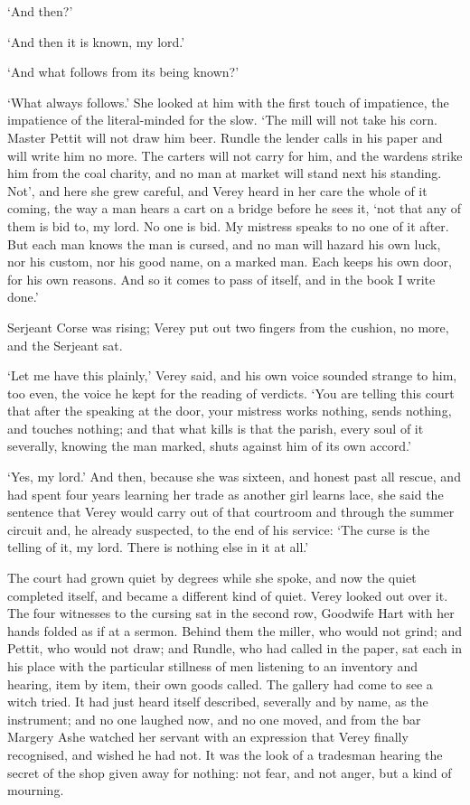 \documentclass[11pt]{article}
\begin{document}
`And then?'

`And then it is known, my lord.'

`And what follows from its being known?'

`What always follows.' She looked at him with the first touch of impatience, the impatience of the literal-minded for the slow. `The mill will not take his corn. Master Pettit will not draw him beer. Rundle the lender calls in his paper and will write him no more. The carters will not carry for him, and the wardens strike him from the coal charity, and no man at market will stand next his standing. Not', and here she grew careful, and Verey heard in her care the whole of it coming, the way a man hears a cart on a bridge before he sees it, `not that any of them is bid to, my lord. No one is bid. My mistress speaks to no one of it after. But each man knows the man is cursed, and no man will hazard his own luck, nor his custom, nor his good name, on a marked man. Each keeps his own door, for his own reasons. And so it comes to pass of itself, and in the book I write done.'

Serjeant Corse was rising; Verey put out two fingers from the cushion, no more, and the Serjeant sat.

`Let me have this plainly,' Verey said, and his own voice sounded strange to him, too even, the voice he kept for the reading of verdicts. `You are telling this court that after the speaking at the door, your mistress works nothing, sends nothing, and touches nothing; and that what kills is that the parish, every soul of it severally, knowing the man marked, shuts against him of its own accord.'

`Yes, my lord.' And then, because she was sixteen, and honest past all rescue, and had spent four years learning her trade as another girl learns lace, she said the sentence that Verey would carry out of that courtroom and through the summer circuit and, he already suspected, to the end of his service: `The curse is the telling of it, my lord. There is nothing else in it at all.'

The court had grown quiet by degrees while she spoke, and now the quiet completed itself, and became a different kind of quiet. Verey looked out over it. The four witnesses to the cursing sat in the second row, Goodwife Hart with her hands folded as if at a sermon. Behind them the miller, who would not grind; and Pettit, who would not draw; and Rundle, who had called in the paper, sat each in his place with the particular stillness of men listening to an inventory and hearing, item by item, their own goods called. The gallery had come to see a witch tried. It had just heard itself described, severally and by name, as the instrument; and no one laughed now, and no one moved, and from the bar Margery Ashe watched her servant with an expression that Verey finally recognised, and wished he had not. It was the look of a tradesman hearing the secret of the shop given away for nothing: not fear, and not anger, but a kind of mourning.
\end{document}
